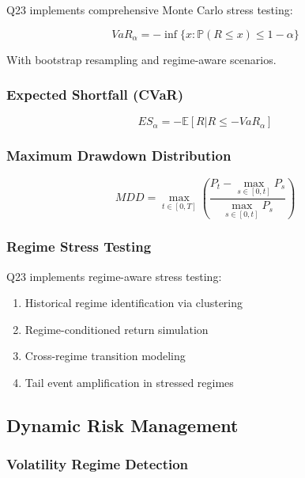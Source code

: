 \documentclass[11pt,letterpaper]{book}
\newcommand{\E}{\mathbb{E}}
\newcommand{\Prob}{\mathbb{P}}
\begin{document}
Q23 implements comprehensive Monte Carlo stress testing:

\begin{equation}
VaR_\alpha = -\inf\{x : \Prob(R \leq x) \leq 1-\alpha\}
\end{equation}

With bootstrap resampling and regime-aware scenarios.

\subsubsection{Expected Shortfall (CVaR)}

\begin{equation}
ES_\alpha = -\E[R | R \leq -VaR_\alpha]
\end{equation}

\subsubsection{Maximum Drawdown Distribution}

\begin{equation}
MDD = \max_{t \in [0,T]} \left( \frac{P_t - \max_{s \in [0,t]} P_s}{\max_{s \in [0,t]} P_s} \right)
\end{equation}

\subsubsection{Regime Stress Testing}

Q23 implements regime-aware stress testing:

\begin{enumerate}
    \item Historical regime identification via clustering
    \item Regime-conditioned return simulation
    \item Cross-regime transition modeling
    \item Tail event amplification in stressed regimes
\end{enumerate}

\subsection{Dynamic Risk Management}

\subsubsection{Volatility Regime Detection}
\end{document}
